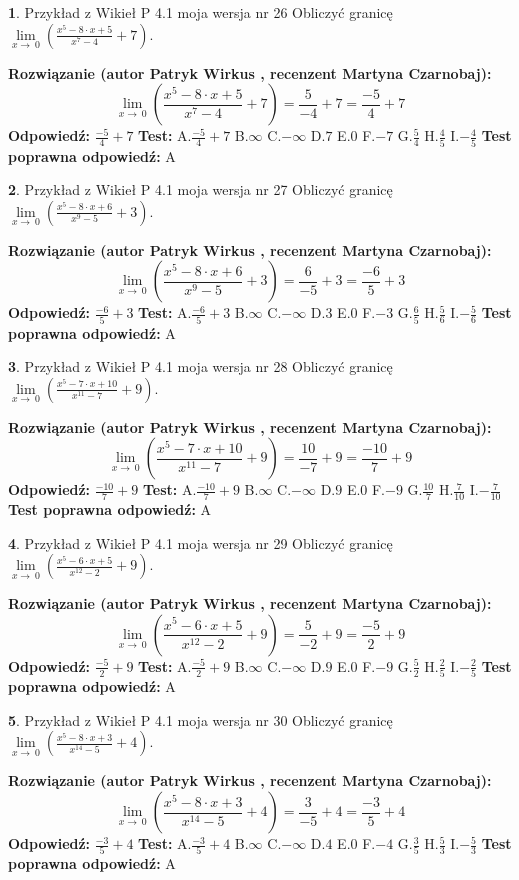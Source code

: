 \documentclass[12pt, a4paper]{article}
\theoremstyle{definition} %
\newtheorem{zad}{}
\newcommand{\zadStart}[1]{\begin{zad}#1\newline}
\newcommand{\zadStop}{\end{zad}}
\newcommand{\rozwStart}[2]{\noindent \textbf{Rozwiązanie (autor #1 , recenzent #2): }\newline}
\newcommand{\rozwStop}{\newline}
\newcommand{\odpStart}{\noindent \textbf{Odpowiedź:}\newline}
\newcommand{\odpStop}{\newline}
\newcommand{\testStart}{\noindent \textbf{Test:}\newline}
\newcommand{\testStop}{\newline}
\newcommand{\kluczStart}{\noindent \textbf{Test poprawna odpowiedź:}\newline}
\newcommand{\kluczStop}{\newline}
\begin{document}
\zadStart{Przykład z Wikieł P 4.1 moja wersja nr 26}
Obliczyć granicę $\lim\limits_{x\to\ 0}(\frac{x^{5}-8 \cdot x +5}{x^{7}-4}+7)$.
\zadStop
\rozwStart{Patryk Wirkus}{Martyna Czarnobaj}
$$\lim\limits_{x\to\ 0}(\frac{x^{5}-8 \cdot x +5}{x^{7}-4}+7)=\frac{5}{-4}+7=\frac{-5}{4}+7$$
\rozwStop
\odpStart
$\frac{-5}{4}+7$
\odpStop
\testStart
A.$\frac{-5}{4}+7$
B.$\infty$
C.$-\infty$
D.$7$
E.$0$
F.$-7$
G.$\frac{5}{4}$
H.$\frac{4}{5}$
I.$-\frac{4}{5}$
\testStop
\kluczStart
A
\kluczStop



\zadStart{Przykład z Wikieł P 4.1 moja wersja nr 27}
Obliczyć granicę $\lim\limits_{x\to\ 0}(\frac{x^{5}-8 \cdot x +6}{x^{9}-5}+3)$.
\zadStop
\rozwStart{Patryk Wirkus}{Martyna Czarnobaj}
$$\lim\limits_{x\to\ 0}(\frac{x^{5}-8 \cdot x +6}{x^{9}-5}+3)=\frac{6}{-5}+3=\frac{-6}{5}+3$$
\rozwStop
\odpStart
$\frac{-6}{5}+3$
\odpStop
\testStart
A.$\frac{-6}{5}+3$
B.$\infty$
C.$-\infty$
D.$3$
E.$0$
F.$-3$
G.$\frac{6}{5}$
H.$\frac{5}{6}$
I.$-\frac{5}{6}$
\testStop
\kluczStart
A
\kluczStop



\zadStart{Przykład z Wikieł P 4.1 moja wersja nr 28}
Obliczyć granicę $\lim\limits_{x\to\ 0}(\frac{x^{5}-7 \cdot x +10}{x^{11}-7}+9)$.
\zadStop
\rozwStart{Patryk Wirkus}{Martyna Czarnobaj}
$$\lim\limits_{x\to\ 0}(\frac{x^{5}-7 \cdot x +10}{x^{11}-7}+9)=\frac{10}{-7}+9=\frac{-10}{7}+9$$
\rozwStop
\odpStart
$\frac{-10}{7}+9$
\odpStop
\testStart
A.$\frac{-10}{7}+9$
B.$\infty$
C.$-\infty$
D.$9$
E.$0$
F.$-9$
G.$\frac{10}{7}$
H.$\frac{7}{10}$
I.$-\frac{7}{10}$
\testStop
\kluczStart
A
\kluczStop



\zadStart{Przykład z Wikieł P 4.1 moja wersja nr 29}
Obliczyć granicę $\lim\limits_{x\to\ 0}(\frac{x^{5}-6 \cdot x +5}{x^{12}-2}+9)$.
\zadStop
\rozwStart{Patryk Wirkus}{Martyna Czarnobaj}
$$\lim\limits_{x\to\ 0}(\frac{x^{5}-6 \cdot x +5}{x^{12}-2}+9)=\frac{5}{-2}+9=\frac{-5}{2}+9$$
\rozwStop
\odpStart
$\frac{-5}{2}+9$
\odpStop
\testStart
A.$\frac{-5}{2}+9$
B.$\infty$
C.$-\infty$
D.$9$
E.$0$
F.$-9$
G.$\frac{5}{2}$
H.$\frac{2}{5}$
I.$-\frac{2}{5}$
\testStop
\kluczStart
A
\kluczStop



\zadStart{Przykład z Wikieł P 4.1 moja wersja nr 30}
Obliczyć granicę $\lim\limits_{x\to\ 0}(\frac{x^{5}-8 \cdot x +3}{x^{14}-5}+4)$.
\zadStop
\rozwStart{Patryk Wirkus}{Martyna Czarnobaj}
$$\lim\limits_{x\to\ 0}(\frac{x^{5}-8 \cdot x +3}{x^{14}-5}+4)=\frac{3}{-5}+4=\frac{-3}{5}+4$$
\rozwStop
\odpStart
$\frac{-3}{5}+4$
\odpStop
\testStart
A.$\frac{-3}{5}+4$
B.$\infty$
C.$-\infty$
D.$4$
E.$0$
F.$-4$
G.$\frac{3}{5}$
H.$\frac{5}{3}$
I.$-\frac{5}{3}$
\testStop
\kluczStart
A
\kluczStop
\end{document}

